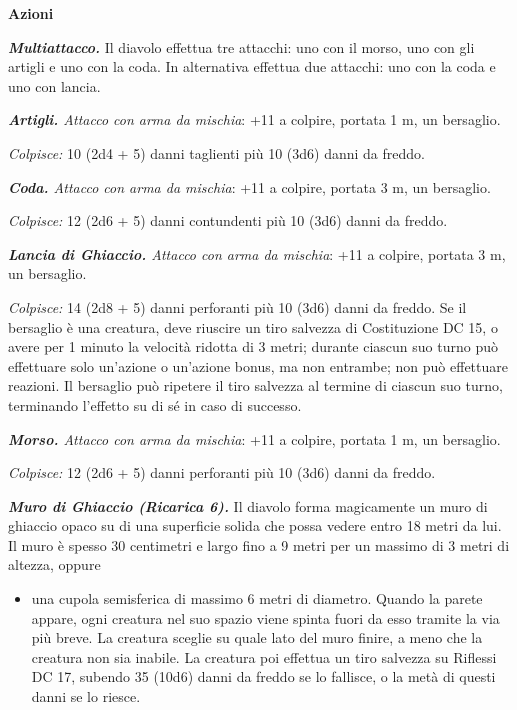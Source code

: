 \begin{multicols}{2}
\smallskip\textbf{Azioni}

\emph{\textbf{Multiattacco.}} Il diavolo effettua tre attacchi: uno con
il morso, uno con gli artigli e uno con la coda. In alternativa effettua
due attacchi: uno con la coda e uno con lancia.

\emph{\textbf{Artigli.} Attacco con arma da mischia}: +11 a colpire,
portata 1 m, un bersaglio.

\emph{Colpisce:} 10 (2d4 + 5) danni taglienti più 10 (3d6) danni da
freddo.

\emph{\textbf{Coda.} Attacco con arma da mischia}: +11 a colpire,
portata 3 m, un bersaglio.

\emph{Colpisce:} 12 (2d6 + 5) danni contundenti più 10 (3d6) danni da
freddo.

\emph{\textbf{Lancia di Ghiaccio.} Attacco con arma da mischia}: +11 a
colpire, portata 3 m, un bersaglio.

\emph{Colpisce:} 14 (2d8 + 5) danni perforanti più 10 (3d6) danni da
freddo. Se il bersaglio è una creatura, deve riuscire un tiro salvezza
di Costituzione DC 15, o avere per 1 minuto la velocità ridotta di 3
metri; durante ciascun suo turno può effettuare solo un'azione o
un'azione bonus, ma non entrambe; non può effettuare reazioni. Il
bersaglio può ripetere il tiro salvezza al termine di ciascun suo turno,
terminando l'effetto su di sé in caso di successo.

\emph{\textbf{Morso.} Attacco con arma da mischia}: +11 a colpire,
portata 1 m, un bersaglio.

\emph{Colpisce:} 12 (2d6 + 5) danni perforanti più 10 (3d6) danni da
freddo.




\emph{\textbf{Muro di Ghiaccio (Ricarica 6).}} Il diavolo forma
magicamente un muro di ghiaccio opaco su di una superficie solida che
possa vedere entro 18 metri da lui. Il muro è spesso 30 centimetri e
largo fino a 9 metri per un massimo di 3 metri di altezza, oppure


\begin{itemize}
\item
  una cupola semisferica di massimo 6 metri di diametro. Quando la
  parete appare, ogni creatura nel suo spazio viene spinta fuori da esso
  tramite la via più breve. La creatura sceglie su quale lato del muro
  finire, a meno che la creatura non sia inabile. La creatura poi
  effettua un tiro salvezza su Riflessi DC 17, subendo 35 (10d6) danni
  da freddo se lo fallisce, o la metà di questi danni se lo riesce.
\end{itemize}



\end{multicols}

